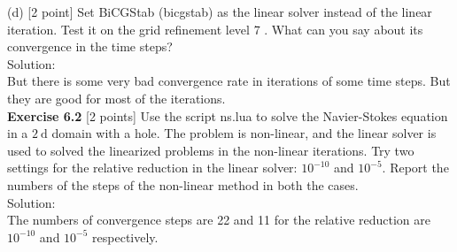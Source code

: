 \documentclass[a4paper]{article}
\begin{document}
\noindent (d) [2 point] Set BiCGStab (bicgstab) as the linear solver instead of the linear iteration. Test it on the grid refinement level 7 . What can you say about its convergence in the time steps?\\

\noindent Solution:\\
\noindent But there is some very bad convergence rate in iterations of some time steps. But they are good for most of the iterations.\\

\noindent \textbf{Exercise 6.2} [2 points] Use the script ns.lua to solve the Navier-Stokes equation in a $2 \mathrm{~d}$ domain with a hole. The problem is non-linear, and the linear solver is used to solved the linearized problems in the non-linear iterations. Try two settings for the relative reduction in the linear solver: $10^{-10}$ and $10^{-5}$. Report the numbers of the steps of the non-linear method in both the cases.\\

\noindent Solution:\\
\noindent The numbers of convergence steps are 22 and 11 for the relative reduction are $10^{-10}$ and $10^{-5}$ respectively.\\
\end{document}
